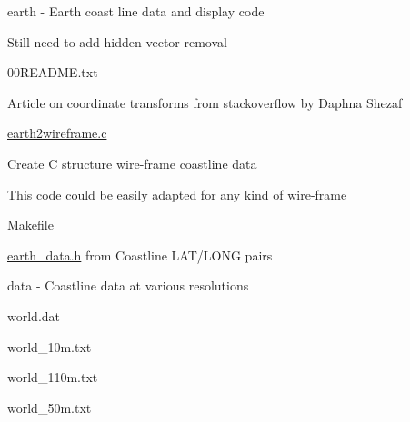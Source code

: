 earth -\/ Earth coast line data and display code
\begin{DoxyItemize}
\item Still need to add hidden vector removal
\begin{DoxyItemize}
\item 00\+R\+E\+A\+D\+M\+E.\+txt
\begin{DoxyItemize}
\item Article on coordinate transforms from stackoverflow by Daphna Shezaf
\end{DoxyItemize}
\item \hyperlink{earth2wireframe_8c}{earth2wireframe.\+c}
\begin{DoxyItemize}
\item Create C structure wire-\/frame coastline data
\item This code could be easily adapted for any kind of wire-\/frame
\end{DoxyItemize}
\item Makefile
\begin{DoxyItemize}
\item \hyperlink{earth__data_8h}{earth\+\_\+data.\+h} from Coastline L\+A\+T/\+L\+O\+NG pairs
\end{DoxyItemize}
\item data -\/ Coastline data at various resolutions
\begin{DoxyItemize}
\item world.\+dat
\item world\+\_\+10m.\+txt
\item world\+\_\+110m.\+txt
\item world\+\_\+50m.\+txt
\end{DoxyItemize}
\end{DoxyItemize}
\end{DoxyItemize}

